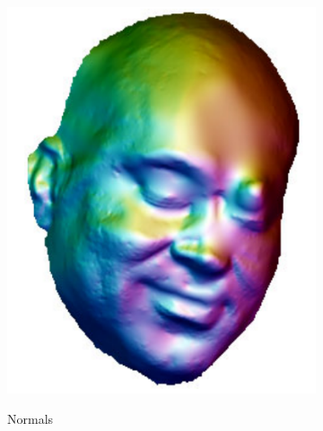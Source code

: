 \begin{figure}
\begin{subfigure}{0.23\textwidth}
        \includegraphics[width=\textwidth]{statistical_normals/images/sirfs_borrowed/sirfs_normals2}
\label{subfig:sirfs-2-normals}
    \caption*{Normals}
    \end{subfigure}
    \begin{subfigure}{0.23\textwidth}
        \centering

\end{subfigure}
\end{figure}
